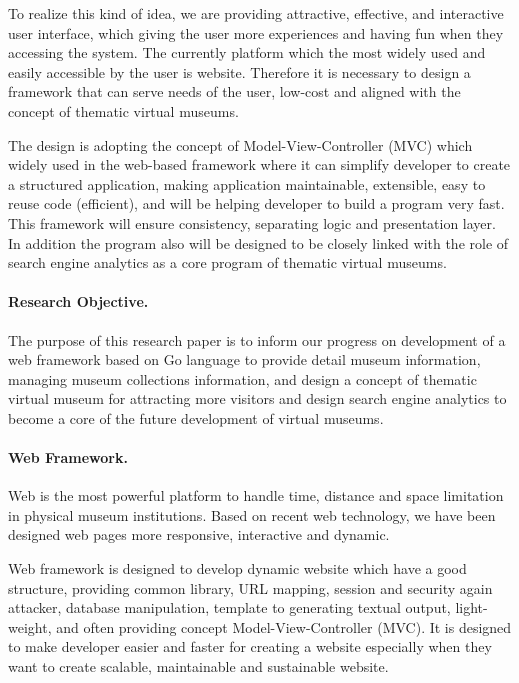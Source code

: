 To realize this kind of idea, we are providing attractive, effective, and interactive user interface, which giving the user more experiences and having fun when they accessing the system. The currently platform which the most widely used and easily accessible by the user is website. Therefore it is necessary to design a framework that can serve needs of the user, low-cost and aligned with the concept of thematic virtual museums.

The design is adopting the concept of Model-View-Controller (MVC) which widely used in the web-based framework where it can simplify developer to create a structured application, making application maintainable, extensible, easy to reuse code (efficient), and will be helping developer to build a program very fast. This framework will ensure consistency, separating logic and presentation layer. In addition the program also will be designed to be closely linked with the role of search engine analytics as a core program of thematic virtual museums.

\paragraph{Research Objective.} The purpose of this research paper is to inform our progress on development of a web framework based on Go language to provide detail museum information, managing museum collections information, and design a concept of thematic virtual museum for attracting more visitors and design search engine analytics to become a core of the future development of virtual museums.

\paragraph{Web Framework.} Web is the most powerful platform to handle time, distance and space limitation in physical museum institutions. Based on recent web technology, we have been designed web pages more responsive, interactive and dynamic.

Web framework is designed to develop dynamic website which have a good structure, providing common library, URL mapping, session and security again attacker, database manipulation, template to generating textual output, light- weight, and often providing concept Model-View-Controller (MVC). It is designed to make developer easier and faster for creating a website especially when they want to create scalable, maintainable and sustainable website.

